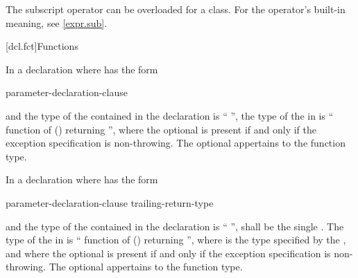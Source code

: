 \pnum
\begin{note}
The subscript operator can be overloaded for a class.
For the operator's built-in meaning, see \ref{expr.sub}.
\end{note}

[dcl.fct]{Functions}%

\pnum
{}%
In a declaration
where
has the form
\begin{ncsimplebnf}
 parameter-declaration-clause \terminal{)} \br
\bnfindent{}  
\end{ncsimplebnf}
and the type of the contained
in the declaration
is
``
'',
the type of the
in
is
``
function of
()
 
returning '',
where the optional  is present
if and only if
the exception specification is non-throwing.
The optional 
appertains to the function type.

\pnum
In a declaration
where
has the form

\begin{ncsimplebnf}
 parameter-declaration-clause \terminal{)} \br
\bnfindent{}   trailing-return-type
\end{ncsimplebnf}

and the type of the contained
in the declaration
is
`` '',
 shall be the single  .
The type of the
in
is
``
function of
()
 
returning '',
where  is the type specified by
the , and
where the optional  is present if and only if
the exception specification is non-throwing.
The optional 
appertains to the function type.

